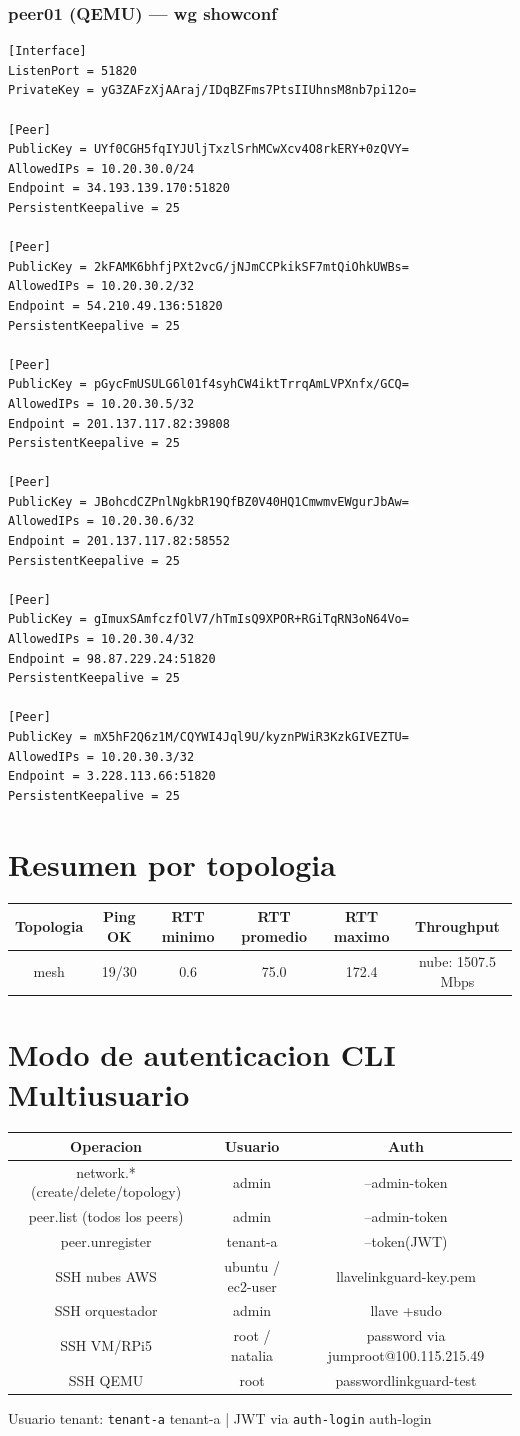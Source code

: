 \documentclass[11pt,a4paper]{article}
\begin{document}
\subsubsection*{peer01 (QEMU) — wg showconf}
\begin{lstlisting}
[Interface]
ListenPort = 51820
PrivateKey = yG3ZAFzXjAAraj/IDqBZFms7PtsIIUhnsM8nb7pi12o=

[Peer]
PublicKey = UYf0CGH5fqIYJUljTxzlSrhMCwXcv4O8rkERY+0zQVY=
AllowedIPs = 10.20.30.0/24
Endpoint = 34.193.139.170:51820
PersistentKeepalive = 25

[Peer]
PublicKey = 2kFAMK6bhfjPXt2vcG/jNJmCCPkikSF7mtQiOhkUWBs=
AllowedIPs = 10.20.30.2/32
Endpoint = 54.210.49.136:51820
PersistentKeepalive = 25

[Peer]
PublicKey = pGycFmUSULG6l01f4syhCW4iktTrrqAmLVPXnfx/GCQ=
AllowedIPs = 10.20.30.5/32
Endpoint = 201.137.117.82:39808
PersistentKeepalive = 25

[Peer]
PublicKey = JBohcdCZPnlNgkbR19QfBZ0V40HQ1CmwmvEWgurJbAw=
AllowedIPs = 10.20.30.6/32
Endpoint = 201.137.117.82:58552
PersistentKeepalive = 25

[Peer]
PublicKey = gImuxSAmfczfOlV7/hTmIsQ9XPOR+RGiTqRN3oN64Vo=
AllowedIPs = 10.20.30.4/32
Endpoint = 98.87.229.24:51820
PersistentKeepalive = 25

[Peer]
PublicKey = mX5hF2Q6z1M/CQYWI4Jql9U/kyznPWiR3KzkGIVEZTU=
AllowedIPs = 10.20.30.3/32
Endpoint = 3.228.113.66:51820
PersistentKeepalive = 25

\end{lstlisting}

\section{Resumen por topologia}
\begin{longtable}{|c|c|c|c|c|c|}
\hline
Topologia & Ping OK & RTT minimo & RTT promedio & RTT maximo & Throughput \\ \hline
mesh & 19/30 & 0.6 & 75.0 & 172.4 & nube: 1507.5 Mbps \\ \hline
\end{longtable}

\section{Modo de autenticacion CLI Multiusuario}
\begin{longtable}{|c|c|c|}
\hline
Operacion & Usuario & Auth \\ \hline
network.* (create/delete/topology) & admin & --admin-token \\ \hline
peer.list (todos los peers) & admin & --admin-token \\ \hline
peer.unregister & tenant-a & --token(JWT) \\ \hline
SSH nubes AWS & ubuntu / ec2-user & llavelinkguard-key.pem \\ \hline
SSH orquestador & admin & llave +sudo \\ \hline
SSH VM/RPi5 & root / natalia & password via jumproot@100.115.215.49 \\ \hline
SSH QEMU & root & passwordlinkguard-test \\ \hline
\end{longtable}

Usuario tenant:  \texttt{tenant-a} tenant-a  | JWT via  \texttt{auth-login} auth-login\\
\end{document}
